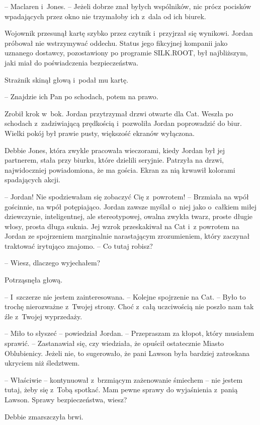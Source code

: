 \documentclass[oneside,polish,11pt,sfheadings]{mwbk}
\begin{document}
-- Maclaren i~Jones. -- Jeżeli dobrze
znał byłych wspólników, nic prócz pocisków wpadających przez okno nie
trzymałoby ich z~dala od ich biurek.

Wojownik przesunął kartę szybko przez czytnik i~przyjrzał się wynikowi.
Jordan próbował nie wstrzymywać oddechu. Status jego fikcyjnej kompanii
jako uznanego dostawcy, pozostawiony po programie SILK.ROOT, był
najbliższym, jaki miał do poświadczenia bezpieczeństwa.

Strażnik skinął głową i~podał mu kartę. 

-- Znajdzie ich Pan po schodach,
potem na prawo.

Zrobił krok w~bok. Jordan przytrzymał drzwi otwarte dla Cat. Weszła po
schodach z~zadziwiającą prędkością i~pozwoliła Jordan poprowadzić do
biur. Wielki pokój był prawie pusty, większość ekranów wyłączona.

Debbie Jones, która zwykle pracowała wieczorami, kiedy Jordan był jej
partnerem, stała przy biurku, które dzielili seryjnie. Patrzyła na
drzwi, najwidoczniej powiadomiona, że ma gościa. Ekran za nią krwawił
kolorami spadających akcji.

-- Jordan! Nie spodziewałam się zobaczyć Cię z~powrotem! -- Brzmiała na
wpół gościnnie, na wpół potępiająco. Jordan zawsze myślał o~niej jako o~całkiem miłej dziewczynie, inteligentnej, ale stereotypowej, owalna
zwykła twarz, proste długie włosy, prosta długa suknia. Jej wzrok
przeskakiwał na Cat i~z powrotem na Jordan ze spojrzeniem marginalnie
narastającym zrozumieniem, który zaczynał traktować irytująco znajomo. -- Co tutaj robisz?

-- Wiesz, dlaczego wyjechałem?

Potrząsnęła głową. 

-- I~szczerze nie jestem zainteresowana. -- Kolejne
spojrzenie na Cat. -- Było to trochę nierozważne z~Twojej strony. Choć z~całą uczciwością nie poszło nam tak źle z~Twojej wyprzedaży.

-- Miło to słyszeć -- powiedział Jordan. -- Przepraszam za kłopot, który
musiałem sprawić. -- Zastanawiał się, czy wiedziała, że opuścił
ostatecznie Miasto Oblubienicy. Jeżeli nie, to sugerowało, że pani
Lawson była bardziej zatroskana ukryciem niż śledztwem.

-- Właściwie -- kontynuował z~brzmiącym zażenowanie śmiechem -- nie jestem
tutaj, żeby się z~Tobą spotkać. Mam pewne sprawy do wyjaśnienia z~panią
Lawson. Sprawy bezpieczeństwa, wiesz?

Debbie zmarszczyła brwi. 
\end{document}
